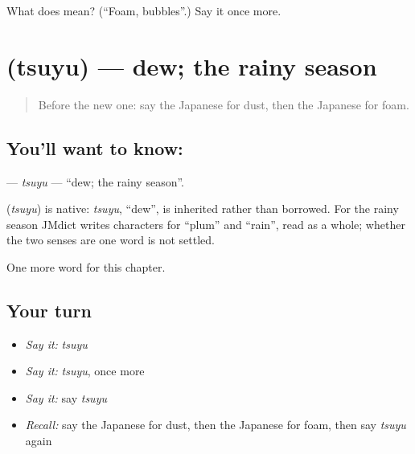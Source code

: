 \begin{tcolorbox}[breakable,colback=teal!4,colframe=teal!35!black,title={Before you move on}]
What does  mean? (\textquotedblleft{}Foam, bubbles\textquotedblright{}.) Say it once more.
\end{tcolorbox}
\section[\texorpdfstring{\ja{つゆ} (tsuyu)}{つゆ (tsuyu)}]{ (tsuyu) — dew; the rainy season}

\label{lesson:JA-C107-tsuyu}



\begin{quote}
Before the new one: say the Japanese for dust, then the Japanese for foam.
\end{quote}

\subsection*{You'll want to know: }
\textbf{} — \emph{tsuyu} — \textquotedblleft{}dew; the rainy season\textquotedblright{}.

\begin{cousinweb}
\textbf{} (\emph{tsuyu}) is native: \emph{tsuyu}, \textquotedblleft{}dew\textquotedblright{}, is inherited rather than borrowed. For the rainy season JMdict writes characters for \textquotedblleft{}plum\textquotedblright{} and \textquotedblleft{}rain\textquotedblright{}, read as a whole; whether the two senses are one word is not settled.
\end{cousinweb}

\begin{grammarlens}[title={What you've built}]
One more word for this chapter.
\end{grammarlens}

\subsection*{Your turn}
\begin{itemize}
\raggedright
  \item \emph{Say it:} \emph{tsuyu}
  \item \emph{Say it:} \emph{tsuyu}, once more
  \item \emph{Say it:} say \emph{tsuyu}
  \item \emph{Recall:} say the Japanese for dust, then the Japanese for foam, then say \emph{tsuyu} again
\end{itemize}

